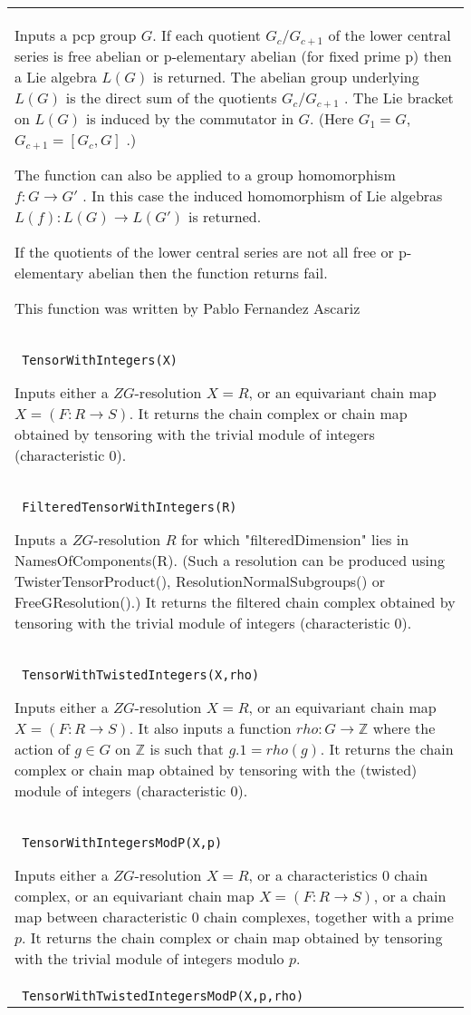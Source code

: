 \documentclass[a4paper,11pt]{report}
\begin{document}
{\begin{center}
\begin{tabular}{|l|}
 Inputs a pcp group $G$. If each quotient $G_c/G_{c+1}$ of the lower central series is free abelian or p-elementary abelian (for fixed
prime p) then a Lie algebra $L(G)$ is returned. The abelian group underlying $L(G)$ is the direct sum of the quotients $G_c/G_{c+1}$ . The Lie bracket on $L(G)$ is induced by the commutator in $G$. (Here $G_1=G$, $G_{c+1}=[G_c,G]$ .) 

 The function can also be applied to a group homomorphism $f: G \longrightarrow G'$ . In this case the induced homomorphism of Lie algebras $L(f):L(G) \longrightarrow L(G')$ is returned.

 If the quotients of the lower central series are not all free or p-elementary
abelian then the function returns fail.

 This function was written by Pablo Fernandez Ascariz \\
 \index{TensorWithIntegers} \texttt{ TensorWithIntegers(X) } 

 Inputs either a $ZG$-resolution $X=R$, or an equivariant chain map $X = (F:R \longrightarrow S)$. It returns the chain complex or chain map obtained by tensoring with the
trivial module of integers (characteristic 0). \\
 \index{FilteredTensorWithIntegers} \texttt{ FilteredTensorWithIntegers(R) } 

 Inputs a $ZG$-resolution $R$ for which "filteredDimension" lies in NamesOfComponents(R). (Such a resolution
can be produced using TwisterTensorProduct(), ResolutionNormalSubgroups() or
FreeGResolution().) It returns the filtered chain complex obtained by
tensoring with the trivial module of integers (characteristic 0). \\
 \index{TensorWithTwistedIntegers} \texttt{ TensorWithTwistedIntegers(X,rho) } 

 Inputs either a $ZG$-resolution $X=R$, or an equivariant chain map $X = (F:R \longrightarrow S)$. It also inputs a function $rho\colon G\rightarrow \mathbb Z$ where the action of $g \in G$ on $\mathbb Z$ is such that $g.1 = rho(g)$. It returns the chain complex or chain map obtained by tensoring with the
(twisted) module of integers (characteristic 0). \\
 \index{TensorWithIntegersModP} \texttt{ TensorWithIntegersModP(X,p) } 

 Inputs either a $ZG$-resolution $X=R$, or a characteristics 0 chain complex, or an equivariant chain map $X = (F:R \longrightarrow S)$, or a chain map between characteristic 0 chain complexes, together with a
prime $p$. It returns the chain complex or chain map obtained by tensoring with the
trivial module of integers modulo $p$. \\
 \index{TensorWithTwistedIntegersModP} \texttt{ TensorWithTwistedIntegersModP(X,p,rho) } 


\end{tabular}
\end{center}}
\end{document}
